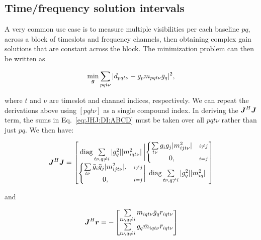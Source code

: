 \documentclass[useAMS,usenatbib]{mn2e}
\newcommand{\mat}[1]{{\bmath{#1}}}
\newcommand{\JJ}{\mat{J}} %
\newcommand{\JHJ}{\JJ^H\JJ} %
\begin{document}
\subsection{Time/frequency solution intervals}

A very common use case is to measure multiple visibilities per each baseline $pq$, across a block of timeslots and frequency 
channels, then obtaining complex gain solutions that are constant across the block. The minimization problem can then
be written as

\begin{equation}
\label{eq:cal:DI:tf}
\min_{\bmath{g}}\sum_{pqt\nu}|d_{pqt\nu}-g_p m_{pqt\nu} \bar{g}_q|^2, 
\end{equation}

where $t$ and $\nu$ are timeslot and channel indices, respectively. We can repeat the derivations above using 
$[pqt\nu]$ as a single compound index. In deriving the $\JHJ$ term, the sums in Eq.~\ref{eq:JHJ:DI:ABCD}
must be taken over all $pqt\nu$ rather than just $pq$. We then have:

\begin{equation}
\label{eq:JHJ:DI:tf}
\JJ^H \JJ = \Matrix{c@{\bigg |}c}{
\mathrm{diag} \sum\limits_{t\nu,q\ne i} |g^2_{q}| |m^2_{iqt\nu}| & 
  \left \{ 
  \begin{array}{@{}cc@{}}
   \sum\limits_{t\nu} g_{i} g_{j} |m^2_{ijt\nu}|&{\scriptstyle i\ne j} \\
   0, &{\scriptstyle i=j}
  \end{array} \right .\\
  \left \{ 
  \begin{array}{@{}cc@{}}
   \sum\limits_{t\nu} \bar{g}_{i} \bar{g}_{j} |m^2_{ijt\nu}|,&{\scriptstyle i\ne j} \\
   0, &{\scriptstyle i=j}
  \end{array} \right . 
  & \mathrm{diag} \sum\limits_{t\nu,q\ne i} |g^2_{q}| |m^2_{iq}| 
}
\end{equation}

and 

\begin{equation}
\label{eq:JHR:DI:tf}
\JJ^H\bmath{r} 
= -\Matrix{c}{
\sum\limits_{t\nu,q\ne i} m_{iqt\nu}\bar{g}_q r_{iqt\nu}   \\
\sum\limits_{t\nu,q\ne i} g_q \bar{m}_{iqt\nu} \bar{r}_{iqt\nu}  
}
\end{equation}
\end{document}
